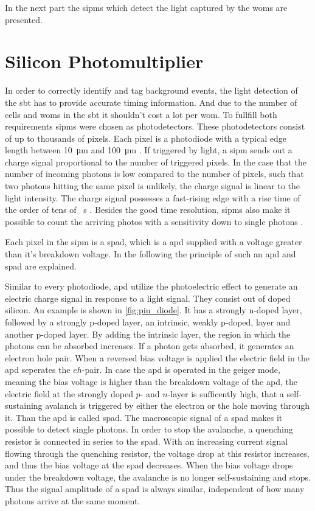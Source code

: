 In the next part the \acp{sipm} which detect the light captured by the \acp{wom} are presented.


\section{Silicon Photomultiplier}
In order to correctly identify and tag background events, the light detection of the \ac{sbt} has to provide accurate timing information.
And due to the number of cells and \acp{wom} in the \ac{sbt} it shouldn't cost a lot per \ac{wom}.
To fullfill both requirements \acp{sipm} were chosen as photodetectors.
These photodetectors consist of up to thousands of pixels.
Each pixel is a photodiode with a typical edge length between \SI{10}{\micro\meter} and \SI{100}{\micro\meter} \cite{nucl}.
If triggered by light, a \ac{sipm} sends out a charge signal proportional to the number of triggered pixels.
In the case that the number of incoming photons is low compared to the number of pixels, such that two photons hitting the same pixel is unlikely, the charge signal is linear to the light intensity.
The charge signal possesses a fast-rising edge with a rise time of the order of tens of \si{\piko\second} \cite{nucl}.
Besides the good time resolution, \acp{sipm} also make it possible to count the arriving photos with a sensitivity down to single photons \cite{HAMA_mppc}.

Each pixel in the \ac{sipm} is a \ac{spad}, which is a \ac{apd} supplied with a voltage greater than it's breakdown voltage.
In the following the principle of such an \ac{apd} and \ac{spad} are explained.

Similar to every photodiode, \ac{apd} utilize the photoelectric effect to generate an electric charge signal in response to a light signal.
They consist out of doped silicon.
An example is shown in \autoref{fig:pin_diode}.
It has a strongly n-doped layer, followed by a strongly p-doped layer, an intrinsic, weakly p-doped, layer and another p-doped layer.
By adding the intrinsic layer, the region in which the photons can be absorbed increases.
If a photon gets absorbed, it generates an electron hole pair.
When a reversed bias voltage is applied the electric field in the \ac{apd} seperates the $eh$-pair.
In case the \ac{apd} is operated in the geiger mode, meaning the bias voltage is higher than the breakdown voltage of the \ac{apd}, the electric field at the strongly doped $p$- and $n$-layer is sufficently high, that a self-sustaining avalanch is triggered by either the electron or the hole moving through it.
Than the \ac{apd} is called \ac{spad}.
The macroscopic signal of a \ac{spad} makes it possible to detect single photons.
In order to stop the avalanche, a quenching resistor is connected in series to the \ac{spad}.
With an increasing current signal flowing through the quenching resistor, the voltage drop at this resistor increases, and thus the bias voltage at the \ac{spad} decreases.
When the bias voltage drops under the breakdown voltage, the avalanche is no longer self-sustaining and stops.
Thus the signal amplitude of a \ac{spad} is always similar, independent of how many photons arrive at the same moment.


